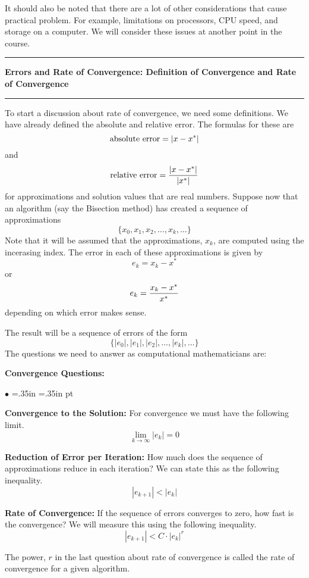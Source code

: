 \documentclass[10pt,fleqn]{article}
\begin{document}
It should also be noted that there are a lot of other considerations that
cause practical problem. For example, limitations on processors, CPU speed, 
and storage on a computer. We will consider these issues at another point in
the course. 
\vskip0.1in\hrule\vskip0.1in
\noindent
{\bf Errors and Rate of Convergence: Definition of Convergence and Rate of
Convergence}
\vskip0.1in\hrule\vskip0.1in
\noindent
To start a discussion about rate of convergence, we need some definitions. We
have already defined the absolute and relative error. The formulas for these
are
$$
  \makebox{absolute error} = | x - x^* |
$$
and 
$$
  \makebox{relative error} = {{| x - x^* |}\over{|x^*|}}
$$
for approximations and solution values that are real numbers. Suppose now that
an algorithm (say the Bisection method) has created a sequence of approximations
$$
  \lbrace x_0, x_1, x_2, \ldots, x_k, \ldots \rbrace
$$
Note that it will be assumed that the approximations, $x_k$, are computed using
the incerasing index. The error in each of these approximations is given by
$$
  e_k = x_k - x^*
$$
or
$$
  e_k = {{ x_k - x^* }\over{x^*}}
$$
depending on which error makes sense.

The result will be a sequence of errors of the form
$$
  \lbrace |e_0|, |e_1|, |e_2|, \ldots, |e_k|, \ldots \rbrace
$$
The questions we need to answer as computational mathematicians are:

{\bf Convergence Questions:}
\begin{list}{$\bullet$}{ \parsep=0pt \listparindent=0pt
\topsep=0pt \rightmargin=.35in \leftmargin=.35in  pt
\itemsep=2pt}
  \item {\bf Convergence to the Solution:} For convergence we must have the
        following limit.
        $$
          \lim_{k\rightarrow\infty} |e_k| = 0
        $$  
  \item {\bf Reduction of Error per Iteration:} How much does the sequence of
        approximations reduce in each iteration? We can state this as the
        following inequality.
        $$
          |e_{k+1}| < |e_k|
        $$
  \item {\bf Rate of Convergence:} If the sequence of errors converges to zero,
        how fast is the convergence?  We will measure this using the following
        inequality.
        $$
          |e_{k+1}| < C\cdot |e_k|^r
        $$
\end{list}
The power, $r$ in the last question about rate of convergence is called the rate
of convergence for a given algorithm.
\end{document}
